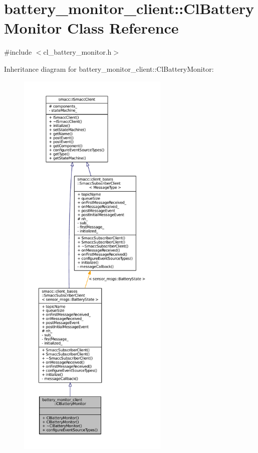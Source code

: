\hypertarget{classbattery__monitor__client_1_1ClBatteryMonitor}{}\section{battery\+\_\+monitor\+\_\+client\+:\+:Cl\+Battery\+Monitor Class Reference}
\label{classbattery__monitor__client_1_1ClBatteryMonitor}


{\ttfamily \#include $<$cl\+\_\+battery\+\_\+monitor.\+h$>$}



Inheritance diagram for battery\+\_\+monitor\+\_\+client\+:\+:Cl\+Battery\+Monitor\+:
\nopagebreak
\begin{figure}[H]
\begin{center}
\leavevmode
\includegraphics[height=550pt]{classbattery__monitor__client_1_1ClBatteryMonitor__inherit__graph}
\end{center}
\end{figure}


